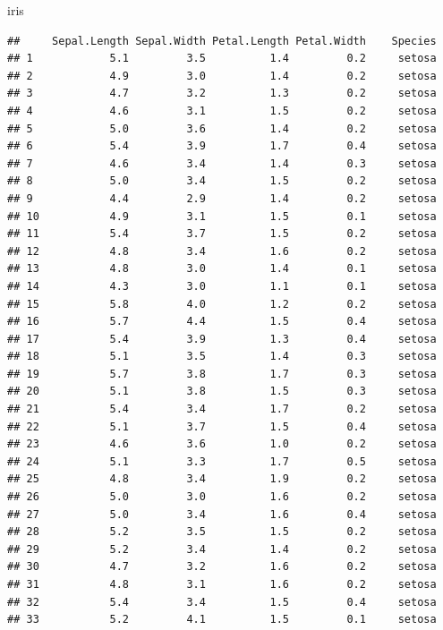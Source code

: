 \documentclass[
]{article}
\newenvironment{Shaded}{\begin{snugshade}}{\end{snugshade}}
\newcommand{\NormalTok}[1]{#1}
\begin{document}
\begin{Shaded}
\begin{Highlighting}[]
\NormalTok{iris}
\end{Highlighting}
\end{Shaded}

\begin{verbatim}
##     Sepal.Length Sepal.Width Petal.Length Petal.Width    Species
## 1            5.1         3.5          1.4         0.2     setosa
## 2            4.9         3.0          1.4         0.2     setosa
## 3            4.7         3.2          1.3         0.2     setosa
## 4            4.6         3.1          1.5         0.2     setosa
## 5            5.0         3.6          1.4         0.2     setosa
## 6            5.4         3.9          1.7         0.4     setosa
## 7            4.6         3.4          1.4         0.3     setosa
## 8            5.0         3.4          1.5         0.2     setosa
## 9            4.4         2.9          1.4         0.2     setosa
## 10           4.9         3.1          1.5         0.1     setosa
## 11           5.4         3.7          1.5         0.2     setosa
## 12           4.8         3.4          1.6         0.2     setosa
## 13           4.8         3.0          1.4         0.1     setosa
## 14           4.3         3.0          1.1         0.1     setosa
## 15           5.8         4.0          1.2         0.2     setosa
## 16           5.7         4.4          1.5         0.4     setosa
## 17           5.4         3.9          1.3         0.4     setosa
## 18           5.1         3.5          1.4         0.3     setosa
## 19           5.7         3.8          1.7         0.3     setosa
## 20           5.1         3.8          1.5         0.3     setosa
## 21           5.4         3.4          1.7         0.2     setosa
## 22           5.1         3.7          1.5         0.4     setosa
## 23           4.6         3.6          1.0         0.2     setosa
## 24           5.1         3.3          1.7         0.5     setosa
## 25           4.8         3.4          1.9         0.2     setosa
## 26           5.0         3.0          1.6         0.2     setosa
## 27           5.0         3.4          1.6         0.4     setosa
## 28           5.2         3.5          1.5         0.2     setosa
## 29           5.2         3.4          1.4         0.2     setosa
## 30           4.7         3.2          1.6         0.2     setosa
## 31           4.8         3.1          1.6         0.2     setosa
## 32           5.4         3.4          1.5         0.4     setosa
## 33           5.2         4.1          1.5         0.1     setosa

\end{verbatim}
\end{document}
